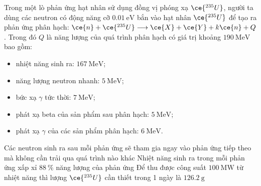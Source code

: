 \begin{ex}
	Trong một lò phản ứng hạt nhân sử dụng đồng vị phóng xạ $\ce{^{235}U}$, người ta dùng các neutron có động năng cỡ $\SI{0.01}{\electronvolt}$ bắn vào hạt nhân $\ce{^{235}U}$ để tạo ra phản ứng phân hạch: $\ce{n}+\ce{^{235}U}\longrightarrow\ce{X}+\ce{Y}+k\ce{n}+Q$. Trong đó $Q$ là năng lượng của quá trình phân hạch có giá trị khoảng $\SI{190}{\mega\electronvolt}$ bao gồm:
	\begin{itemize}
		\item nhiệt năng sinh ra: $\SI{167}{\mega\electronvolt}$;
		\item năng lượng neutron nhanh: $\SI{5}{\mega\electronvolt}$;
		\item bức xạ $\gamma$ tức thời: $\SI{7}{\mega\electronvolt}$;
		\item phát xạ beta của sản phẩm sau phân hạch: $\SI{5}{\mega\electronvolt}$;
		\item phát xạ $\gamma$ của các sản phẩm phân hạch: $\SI{6}{\mega\electronvolt}$.
	\end{itemize}
	{Các neutron sinh ra sau mỗi phản ứng sẽ tham gia ngay vào phản ứng tiếp theo mà không cần trải qua quá trình nào khác}
	{\True Nhiệt năng sinh ra trong mỗi phản ứng xấp xỉ $\SI{88}{\percent}$ năng lượng của phản ứng}
	{\True Để thu được công suất $\SI{100}{\mega\watt}$ từ nhiệt năng thì lượng $\ce{^{235}U}$ cần thiết trong 1 ngày là $\SI{126.2}{\gram}$}
\end{ex}
